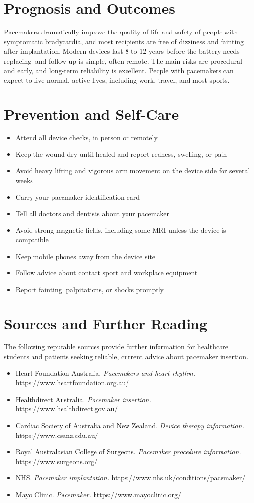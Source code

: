 \section*{Prognosis and Outcomes}
Pacemakers dramatically improve the quality of life and safety of people with symptomatic bradycardia, and most recipients are free of dizziness and fainting after implantation. Modern devices last 8 to 12 years before the battery needs replacing, and follow-up is simple, often remote. The main risks are procedural and early, and long-term reliability is excellent. People with pacemakers can expect to live normal, active lives, including work, travel, and most sports.

\section*{Prevention and Self-Care}
\begin{itemize}
    \item Attend all device checks, in person or remotely
    \item Keep the wound dry until healed and report redness, swelling, or pain
    \item Avoid heavy lifting and vigorous arm movement on the device side for several weeks
    \item Carry your pacemaker identification card
    \item Tell all doctors and dentists about your pacemaker
    \item Avoid strong magnetic fields, including some MRI unless the device is compatible
    \item Keep mobile phones away from the device site
    \item Follow advice about contact sport and workplace equipment
    \item Report fainting, palpitations, or shocks promptly
\end{itemize}

\section*{Sources and Further Reading}
The following reputable sources provide further information for healthcare students and patients seeking reliable, current advice about pacemaker insertion.
\begin{itemize}
    \item Heart Foundation Australia. \textit{Pacemakers and heart rhythm.} https://www.heartfoundation.org.au/
    \item Healthdirect Australia. \textit{Pacemaker insertion.} https://www.healthdirect.gov.au/
    \item Cardiac Society of Australia and New Zealand. \textit{Device therapy information.} https://www.csanz.edu.au/
    \item Royal Australasian College of Surgeons. \textit{Pacemaker procedure information.} https://www.surgeons.org/
    \item NHS. \textit{Pacemaker implantation.} https://www.nhs.uk/conditions/pacemaker/
    \item Mayo Clinic. \textit{Pacemaker.} https://www.mayoclinic.org/
\end{itemize}
